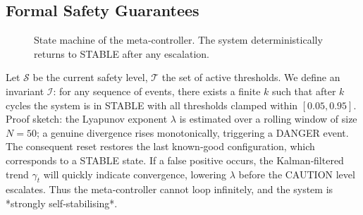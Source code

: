 \subsection{Formal Safety Guarantees}
\begin{figure}[htbp]
\centering
{}
\caption{State machine of the meta‑controller.  The system deterministically returns to STABLE after any escalation.}
\label{fig:statemachine}
\end{figure}

Let $\mathcal{S}$ be the current safety level, $\mathcal{T}$ the set of active thresholds.  
We define an invariant $\mathcal{I}$: for any sequence of events, there exists a finite $k$ such that after $k$ cycles the system is in STABLE with all thresholds clamped within $[0.05,0.95]$.  
Proof sketch: the Lyapunov exponent $\lambda$ is estimated over a rolling window of size $N=50$; a genuine divergence rises monotonically, triggering a DANGER event.  The consequent reset restores the last known‑good configuration, which corresponds to a STABLE state.  If a false positive occurs, the Kalman‑filtered trend $\gamma_t$ will quickly indicate convergence, lowering $\lambda$ before the CAUTION level escalates.  Thus the meta‑controller cannot loop infinitely, and the system is *strongly self‑stabilising*.


